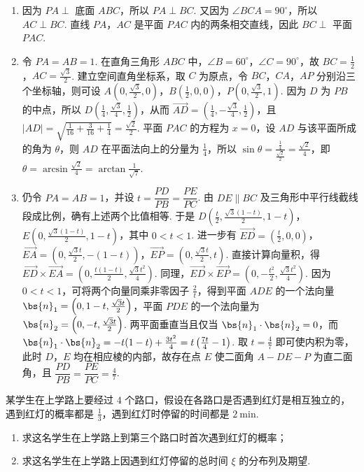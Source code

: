 \begin{solution}
\begin{enumerate}
\item 因为 \(PA\perp\) 底面 \(ABC\)，所以 \(PA\perp BC\). 又因为 \(\angle BCA=90^{\circ}\)，所以 \(AC\perp BC\). 直线 \(PA\)，\(AC\) 是平面 \(PAC\) 内的两条相交直线，因此 \(BC\perp\) 平面 \(PAC\).
\item 令 \(PA=AB=1\). 在直角三角形 \(ABC\) 中，\(\angle B=60^{\circ}\)，\(\angle C=90^{\circ}\)，故 \(BC=\frac12\)，\(AC=\frac{\sqrt3}{2}\). 建立空间直角坐标系，取 \(C\) 为原点，令 \(BC\)，\(CA\)，\(AP\) 分别沿三个坐标轴，则可设 \(A\left(0,\frac{\sqrt3}{2},0\right)\)，\(B\left(\frac12,0,0\right)\)，\(P\left(0,\frac{\sqrt3}{2},1\right)\). 因为 \(D\) 为 \(PB\) 的中点，所以 \(D\left(\frac14,\frac{\sqrt3}{4},\frac12\right)\)，从而 \(\overrightarrow{AD}=\left(\frac14,-\frac{\sqrt3}{4},\frac12\right)\)，且 \(|AD|=\sqrt{\frac1{16}+\frac3{16}+\frac14}=\frac{\sqrt2}{2}\). 平面 \(PAC\) 的方程为 \(x=0\)，设 \(AD\) 与该平面所成的角为 \(\theta\)，则 \(AD\) 在平面法向上的分量为 \(\frac14\)，所以 \(\sin\theta=\frac{\frac{1}{4}}{\frac{\sqrt2}{2}}=\frac{\sqrt2}{4}\)，即 \(\theta=\arcsin\frac{\sqrt2}{4}=\arctan\frac1{\sqrt7}\).
\item 仍令 \(PA=AB=1\)，并设 \(t=\dfrac{PD}{PB}=\dfrac{PE}{PC}\). 由 \(DE\parallel BC\) 及三角形中平行线截线段成比例，确有上述两个比值相等. 于是 \(D\left(\frac{t}{2},\frac{\sqrt3(1-t)}{2},1-t\right)\)，\(E\left(0,\frac{\sqrt3(1-t)}{2},1-t\right)\)，其中 \(0<t<1\). 进一步有 \(\overrightarrow{ED}=\left(\frac{t}{2},0,0\right)\)，\(\overrightarrow{EA}=\left(0,\frac{\sqrt3t}{2},-(1-t)\right)\)，\(\overrightarrow{EP}=\left(0,\frac{\sqrt3t}{2},t\right)\). 直接计算向量积，得 \(\overrightarrow{ED}\times\overrightarrow{EA}=\left(0,\frac{t(1-t)}{2},\frac{\sqrt3t^2}{4}\right)\). 同理，\(\overrightarrow{ED}\times\overrightarrow{EP}=\left(0,-\frac{t^2}{2},\frac{\sqrt3t^2}{4}\right)\). 因为 \(0<t<1\)，可将两个向量同乘非零因子 \(\frac2t\)，得到平面 \(ADE\) 的一个法向量 \(\bs{n}_1=\left(0,1-t,\frac{\sqrt3t}{2}\right)\)，平面 \(PDE\) 的一个法向量为 \(\bs{n}_2=\left(0,-t,\frac{\sqrt3t}{2}\right)\).
两平面垂直当且仅当 \(\bs{n}_1\cdot\bs{n}_2=0\)，而 \(\bs{n}_1\cdot\bs{n}_2=-t(1-t)+\frac{3t^2}{4}=t\left(\frac{7t}{4}-1\right)\). 取 \(t=\frac47\) 即可使内积为零，此时 \(D\)，\(E\) 均在相应棱的内部，故存在点 \(E\) 使二面角 \(A-DE-P\) 为直二面角，且 \(\dfrac{PD}{PB}=\dfrac{PE}{PC}=\frac47\).
\end{enumerate}
\end{solution}

\begin{problem}
某学生在上学路上要经过 \(4\) 个路口，假设在各路口是否遇到红灯是相互独立的，遇到红灯的概率都是 \(\frac{1}{3}\)，遇到红灯时停留的时间都是 \(2 \mathrm{~min}\).

\begin{enumerate}
\item 求这名学生在上学路上到第三个路口时首次遇到红灯的概率；
\item 求这名学生在上学路上因遇到红灯停留的总时间 \(\xi\) 的分布列及期望.
\end{enumerate}
\end{problem}

